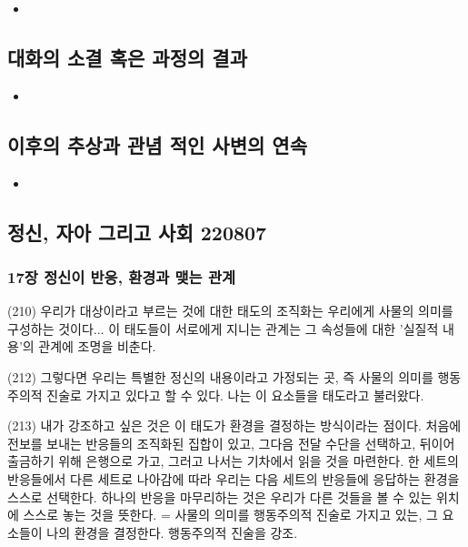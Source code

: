 \documentclass[12pt, a4paper]{article}
\begin{document}
\begin{itemize}
    \item 
\end{itemize}


\subsection{대화의 소결 혹은 과정의 결과}


\begin{itemize}
    \item 
\end{itemize}


\subsection{이후의 추상과 관념 적인 사변의 연속}


\begin{itemize}
    \item 
\end{itemize}






\newpage
\subsection{정신, 자아 그리고 사회 220807}

\subsubsection{17장 정신이 반응, 환경과 맺는 관계}
(210) 우리가 대상이라고 부르는 것에 대한 태도의 조직화는 우리에게 사물의 의미를 구성하는 것이다... 이 태도들이 서로에게 지니는 관계는 그 속성들에 대한 '실질적 내용'의 관계에 조명을 비춘다. 

(212) 그렇다면 우리는 특별한 정신의 내용이라고 가정되는 곳, 즉 사물의 의미를 행동주의적 진술로 가지고 있다고 할 수 있다. 나는 이 요소들을 태도라고 불러왔다. 

(213) 내가 강조하고 싶은 것은 이 태도가 환경을 결정하는 방식이라는 점이다. 처음에 전보를 보내는 반응들의 조직화된 집합이 있고, 그다음 전달 수단을 선택하고, 뒤이어 출금하기 위해 은행으로 가고, 그러고 나서는 기차에서 읽을 것을 마련한다. 한 세트의 반응들에서 다른 세트로 나아감에 따라 우리는 다음 세트의 반응들에 응답하는 환경을 스스로 선택한다. 하나의 반응을 마무리하는 것은 우리가 다른 것들을 볼 수 있는 위치에 스스로 놓는 것을 뜻한다. 
= 사물의 의미를 행동주의적 진술로 가지고 있는, 그 요소들이 나의 환경을 결정한다. 행동주의적 진술을 강조. 
\end{document}
